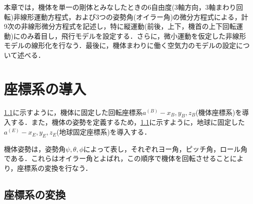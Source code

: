 
本章では，機体を単一の剛体とみなしたときの6自由度(3軸方向，3軸まわり回転)非線形運動方程式，および3つの姿勢角(オイラー角)の微分方程式による，計9次の非線形微分方程式を記述し，特に縦運動(前後，上下，機首の上下回転運動)にのみ着目し，飛行モデルを設定する．さらに，微小運動を仮定した非線形モデルの線形化を行なう．最後に，機体まわりに働く空気力のモデルの設定について述べる．

\section{座標系の導入}
\label{sec:axis}

\ref{}に示すように，機体に固定した回転座標系$a^{(B)}-x_B,y_B,z_B$(機体座標系)を導入する．また，機体の姿勢を定義するため，\ref{}に示すように，地球に固定した$a^{(E)}-x_E,y_E,z_E$(地球固定座標系)を導入する．

機体姿勢は，姿勢角$\psi,\theta,\phi$によって表し，それぞれヨー角，ピッチ角，ロール角である．これらはオイラー角とよばれ，この順序で機体を回転させることにより，座標系の変換を行なう．

\subsection{座標系の変換}

